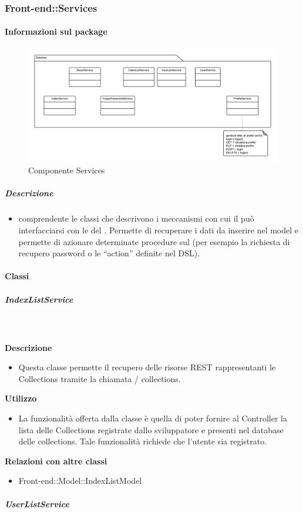 	\subsubsection{Front-end::Services}
	\paragraph{Informazioni sul package} 
		\begin{figure}[H] 
			\begin{center} 
				\includegraphics[width=\textwidth]{uml/package/Front-end::Services.png}  
				\caption{Componente Services}
			\end{center}  
		\end{figure} 
	\subparagraph{Descrizione} 
		\begin{itemize}
		\item[]  comprendente le classi che descrivono i meccanismi con cui il  può interfacciarsi con le  del . Permette di recuperare i dati da inserire nel model e permette di azionare determinate procedure sul  (per esempio la richiesta di recupero password o le ``action'' definite nel DSL).
		\end{itemize} 
		\paragraph{Classi}
			\subparagraph{IndexListService}
				
				\textbf{\\ \\ Descrizione} 
					\begin{itemize}
						\item[] Questa classe permette il recupero delle risorse REST rappresentanti le Collections tramite la chiamata / collections.
					\end{itemize}      
				\textbf{Utilizzo}  
					\begin{itemize}
						\item[] La funzionalità offerta dalla classe è quella di poter fornire al Controller la lista delle Collections registrate dallo sviluppatore e presenti nel database delle collections.
Tale funzionalità richiede che l'utente sia registrato.
					\end{itemize}
					\textbf{Relazioni con altre classi}
					\begin{itemize}
							\item{Front-end::Model::IndexListModel}
					\end{itemize}
			\subparagraph{UserListService}
				
